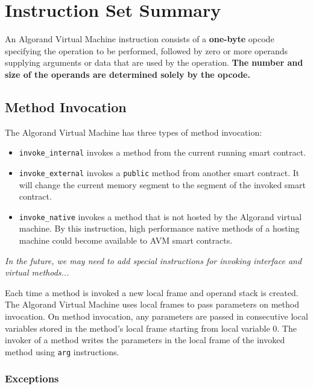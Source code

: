 \documentclass[11pt, A4]{report}
\begin{document}
    \section{Instruction Set Summary}\label{sec:instruction-set-summary}

    An Algorand Virtual Machine instruction consists of a \textbf{one-byte} opcode specifying the operation to be
    performed, followed by zero or more operands supplying arguments or data that are used by the operation.
    \textbf{The number and size of the operands are determined solely by the opcode.}

    \subsection{Method Invocation}\label{subsec:method-invocation}

    The Algorand Virtual Machine has three types of method invocation:
    \begin{itemize}
        \item \texttt{invoke\_internal} invokes a method from the current running smart contract.
        \item \texttt{invoke\_external} invokes a \texttt{public} method from another smart contract. It will change
        the current memory segment to the segment of the invoked smart contract.
        \item \texttt{invoke\_native} invokes a method that is not hosted by the Algorand virtual machine. By this
        instruction, high performance native methods of a hosting machine could become available to AVM smart contracts.
    \end{itemize}

    \emph{In the future, we may need to add special instructions for invoking interface and virtual methods...}

    Each time a method is invoked a new local frame and operand stack is created. The Algorand Virtual Machine uses
    local frames to pass parameters on method invocation. On method invocation, any parameters are passed in
    consecutive local variables stored in the method's local frame starting from local variable 0. The invoker of a
    method writes the parameters in the local frame of the invoked method using \texttt{arg} instructions.

    \subsubsection{Exceptions}
\end{document}
